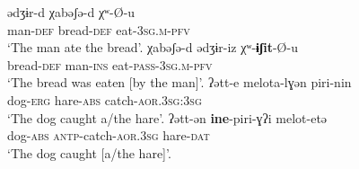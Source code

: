 \ea {} \citep[235]{belay:2015}
	\ea\label{ex:Khimtanga:eat:a}
	\gll	ədʒɨr-d 			χabəʃə-d 			χʷ-Ø-u					\\
			man-\textsc{def}	bread-\textsc{def}	eat-\textsc{3sg.m-pfv}	\\
	\glt	‘The man ate the bread’.
	\ex\label{ex:Khimtanga:eat:b}
	\gll	χabəʃə-d {\ob}ədʒɨr-iz{\cb} χʷ-\textbf{ɨʃit}-Ø-u \\
			bread-\textsc{def} {\db}man-\textsc{ins} eat-\textsc{pass-3sg.m-pfv} \\
	\glt	‘The bread was eaten [by the man]’.
	\z
\z
\ea {} \citep[314]{polinsky:2017}
	\ea\label{ex:Chukchi:catch:a}
	\gll	ʔətt-e 				melota-lɣən 		piri-nin 					\\
			dog-\textsc{erg}	hare-\textsc{abs}	catch-\textsc{aor.3sg:3sg}	\\
	\glt	‘The dog caught a/the hare’.
	\ex\label{ex:Chukchi:catch:b}
	\gll	ʔətt-ən \textbf{ine}-piri-ɣʔi {\ob}melot-etə{\cb} \\
			dog-\textsc{abs} \textsc{antp}-catch-\textsc{aor.3sg} {\db}hare-\textsc{dat} \\
	\glt	‘The dog caught [a/the hare]’.
	\z
\z

